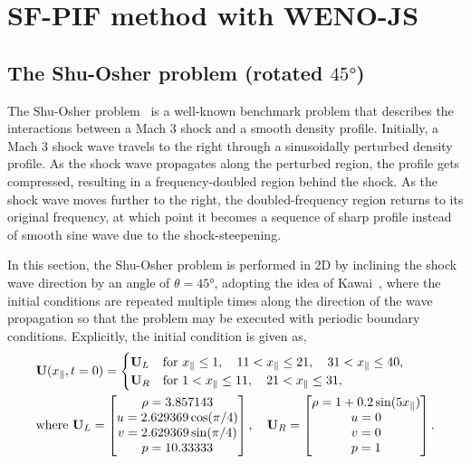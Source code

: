 \section{SF-PIF method with WENO-JS}\label{sec:result_wenojs}


\subsection{The Shu-Osher problem (rotated \(\ang{45}\))}\label{subsec:shu45_weno}

The Shu-Osher problem~\cite{shu1989efficient} is a well-known benchmark problem
that describes the interactions between a Mach 3 shock and a smooth density profile.
Initially, a Mach 3 shock wave travels to the right through a sinusoidally perturbed
density profile. As the shock wave propagates along the perturbed region,
the profile gets compressed, resulting in a frequency-doubled region behind the shock. 
As the shock wave moves further to the right,
the doubled-frequency region returns to its original frequency, at which point
it becomes a sequence of sharp profile instead of smooth sine wave
due to the shock-steepening.

In this section, the Shu-Osher problem is performed in 2D by inclining the shock wave direction
by an angle of \(\theta = \ang{45} \),
adopting the idea of Kawai~\cite{kawai2013divergence},
where the initial conditions are repeated multiple times along the direction of the
wave propagation so that the problem may be executed with periodic boundary conditions.
Explicitly, the initial condition is given as,
\begin{equation}\label{eq:shu45_gov}
    \begin{split}
        &\mathbf{U}(x_{\parallel}, t=0) = \begin{cases}
            \mathbf{U}_{L} & \text{for } x_{\parallel} \le 1, \quad 11 < x_{\parallel} \le 21, \quad 31 < x_{\parallel} \le 40, \\
            \mathbf{U}_{R} & \text{for } 1 < x_{\parallel} \le 11, \quad 21 < x_{\parallel} \le 31,
        \end{cases}\\
        &\text{where } \mathbf{U}_{L} = \begin{bmatrix}
            \rho = 3.857143 \\
            u = 2.629369\cos(\pi/4) \\
            v = 2.629369\sin(\pi/4) \\
            p = 10.33333
        \end{bmatrix},\quad
        \mathbf{U}_{R} = \begin{bmatrix}
            \rho = 1 + 0.2\sin(5 x_{\parallel}) \\
            u = 0 \\
            v = 0 \\
            p = 1
        \end{bmatrix}.
    \end{split}
\end{equation}


